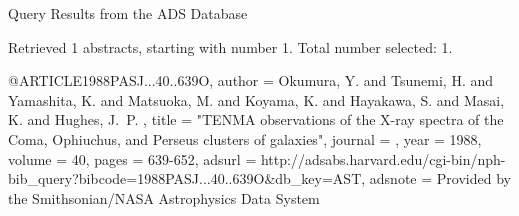 Query Results from the ADS Database


Retrieved 1 abstracts, starting with number 1.  Total number selected: 1.

@ARTICLE{1988PASJ...40..639O,
   author = {{Okumura}, Y. and {Tsunemi}, H. and {Yamashita}, K. and {Matsuoka}, M. and 
	{Koyama}, K. and {Hayakawa}, S. and {Masai}, K. and {Hughes}, J.~P.
	},
    title = "{TENMA observations of the X-ray spectra of the Coma, Ophiuchus, and Perseus clusters of galaxies}",
  journal = {\pasj},
     year = 1988,
   volume = 40,
    pages = {639-652},
   adsurl = {http://adsabs.harvard.edu/cgi-bin/nph-bib_query?bibcode=1988PASJ...40..639O&db_key=AST},
  adsnote = {Provided by the Smithsonian/NASA Astrophysics Data System}
}


